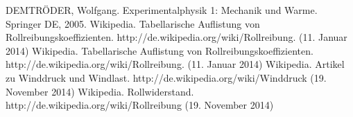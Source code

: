 \pagebreak
\begin{thebibliography}{9}
 DEMTRÖDER, Wolfgang. Experimentalphysik 1: Mechanik und Warme. Springer DE, 2005.
 Wikipedia. Tabellarische Auflistung von Rollreibungskoeffizienten. http://de.wikipedia.org/wiki/Rollreibung. (11. Januar 2014)
 Wikipedia. Tabellarische Auflistung von Rollreibungskoeffizienten. http://de.wikipedia.org/wiki/Rollreibung. (11. Januar 2014)
 Wikipedia. Artikel zu Winddruck und Windlast. http://de.wikipedia.org/wiki/Winddruck (19. November 2014)
 Wikipedia. Rollwiderstand. http://de.wikipedia.org/wiki/Rollreibung (19. November 2014)



\end{thebibliography}

